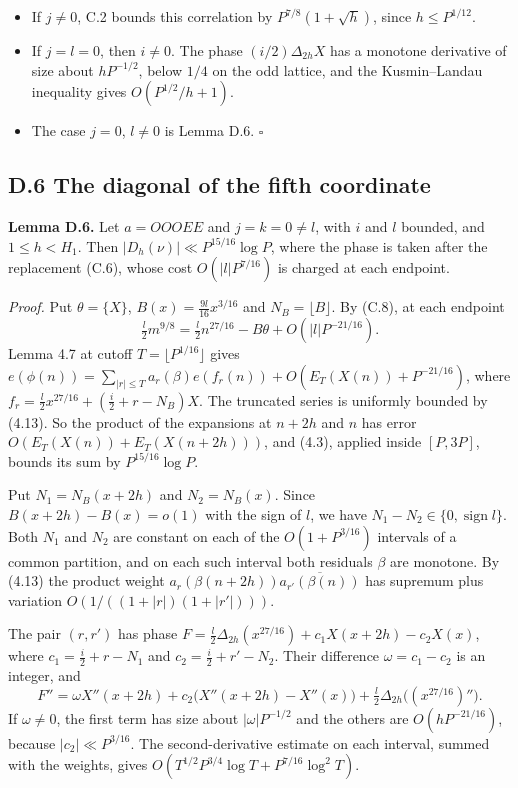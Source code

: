 \documentclass[11pt,a4paper]{article}
\providecommand{\tightlist}{\setlength{\itemsep}{0pt}\setlength{\parskip}{0pt}}
\begin{document}
\begin{itemize}
\tightlist
\item
  If \(j\ne0\), C.2 bounds this correlation by \(P^{7/8}(1+\sqrt h)\),
  since \(h\le P^{1/12}\).
\item
  If \(j=l=0\), then \(i\ne0\). The phase \((i/2)\Delta_{2h}X\) has a
  monotone derivative of size about \(hP^{-1/2}\), below \(1/4\) on the
  odd lattice, and the Kusmin--Landau inequality gives
  \(O(P^{1/2}/h+1)\).
\item
  The case \(j=0\), \(l\ne0\) is Lemma D.6. \(\square\)
\end{itemize}


\subsection{D.6 The diagonal of the fifth
coordinate}\label{d.6-the-diagonal-of-the-fifth-coordinate}

\textbf{Lemma D.6.} Let \(a=OOOEE\) and \(j=k=0\neq l\), with \(i\) and
\(l\) bounded, and \(1\le h<H_1\). Then
\(|D_h(\nu)|\ll P^{15/16}\log P\), where the phase is taken after the
replacement (C.6), whose cost \(O(|l|P^{7/16})\) is charged at each
endpoint.

\emph{Proof.} Put \(\theta=\{X\}\), \(B(x)=\tfrac{9l}{16}x^{3/16}\) and
\(N_B=\lfloor B\rfloor\). By (C.8), at each endpoint \[
\tfrac l2m^{9/8}=\tfrac l2n^{27/16}-B\theta+O(|l|P^{-21/16}).
\] Lemma 4.7 at cutoff \(T=\lfloor P^{1/16}\rfloor\) gives
\(e(\phi(n))=\sum_{|r|\le T}a_r(\beta)e(f_r(n))+O(E_T(X(n))+P^{-21/16})\),
where \(f_r=\tfrac l2x^{27/16}+(\tfrac i2+r-N_B)X\). The truncated
series is uniformly bounded by (4.13). So the product of the expansions
at \(n+2h\) and \(n\) has error \(O(E_T(X(n))+E_T(X(n+2h)))\), and
(4.3), applied inside \([P,3P]\), bounds its sum by \(P^{15/16}\log P\).

Put \(N_1=N_B(x+2h)\) and \(N_2=N_B(x)\). Since \(B(x+2h)-B(x)=o(1)\)
with the sign of \(l\), we have
\(N_1-N_2\in\{0,\operatorname{sign}l\}\). Both \(N_1\) and \(N_2\) are
constant on each of the \(O(1+P^{3/16})\) intervals of a common
partition, and on each such interval both residuals \(\beta\) are
monotone. By (4.13) the product weight
\(a_r(\beta(n+2h))\overline{a_{r'}(\beta(n))}\) has supremum plus
variation \(O(1/((1+|r|)(1+|r'|)))\).

The pair \((r,r')\) has phase
\(F=\tfrac l2\Delta_{2h}(x^{27/16})+c_1X(x+2h)-c_2X(x)\), where
\(c_1=\tfrac i2+r-N_1\) and \(c_2=\tfrac i2+r'-N_2\). Their difference
\(\omega=c_1-c_2\) is an integer, and \[
F''=\omega X''(x+2h)+c_2\bigl(X''(x+2h)-X''(x)\bigr)
+\tfrac l2\Delta_{2h}\bigl((x^{27/16})''\bigr).
\] If \(\omega\ne0\), the first term has size about \(|\omega|P^{-1/2}\)
and the others are \(O(hP^{-21/16})\), because \(|c_2|\ll P^{3/16}\).
The second-derivative estimate on each interval, summed with the
weights, gives \(O(T^{1/2}P^{3/4}\log T+P^{7/16}\log^2T)\).
\end{document}
